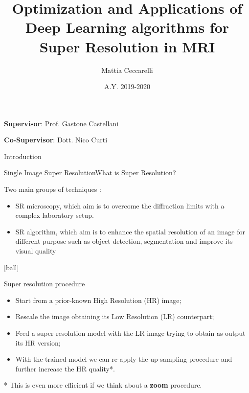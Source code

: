 \documentclass[10pt, unicode]{beamer}
\title{Optimization and Applications of Deep Learning algorithms for Super Resolution in MRI}
\author{Mattia Ceccarelli}
\institute{Master Degree in Physics \\ Alma Mater Studiorum - University of Bologna}
\date{A.Y. 2019-2020}
\begin{document}
\begin{frame}
 \maketitle
 
  {\bf Supervisor}:  Prof. Gastone Castellani
 
  {\bf Co-Supervisor}: Dott. Nico Curti

\end{frame}

\begin{frame}{Introduction}
 
\end{frame}


\begin{frame}{Single Image Super Resolution}{What is Super Resolution?}

  
  \scriptsize{Two main groups of techniques : }
  \begin{itemize}
   \item SR microscopy, which aim is to overcome the diffraction limits with a complex laboratory setup.
   \item SR algorithm, which aim is to enhance the spatial resolution of an image for different purpose such as object detection, segmentation and improve its visual quality
  \end{itemize}

  [ball]

  \begin{exampleblock}{Super resolution procedure}
    \begin{itemize}

      \item Start from a prior-known High Resolution (HR) image;
      \item Rescale the image obtaining its Low Resolution (LR) counterpart;
      \item Feed a super-resolution model with the LR image trying to obtain as output its HR version;
      \item With the trained model we can re-apply the up-sampling procedure and further increase the HR quality*.

    \end{itemize}
  \end{exampleblock}

  \vspace{0.5cm}
  \scriptsize{* This is even more efficient if we think about a \textbf{zoom} procedure.}

\end{frame}
\end{document}
